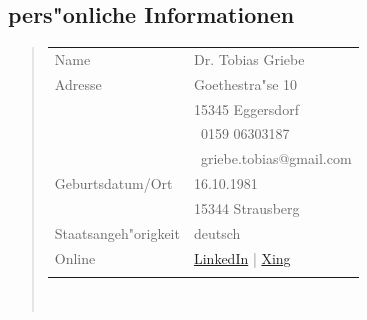 \subsection*{pers"onliche Informationen}
\begin{quote}
	\begin{tabular}{p{4cm}l}
		Name&Dr. Tobias Griebe\\
		Adresse&Goethestra"se 10\\
		&15345 Eggersdorf\\
		&\Mobilefone\ 0159 06303187\\	
		&\MVAt\ griebe.tobias@gmail.com\\
		Geburtsdatum/Ort&16.10.1981\\
		&15344 Strausberg\\
		Staatsangeh"origkeit&deutsch\\
		Online&
		\href{https://www.linkedin.com/in/dr-tobias-griebe-7b654416b}{LinkedIn} | 
		\href{https://www.xing.com/profile/Tobias_Griebe3}{Xing}\\\\
		
	\end{tabular}\\
\end{quote}

